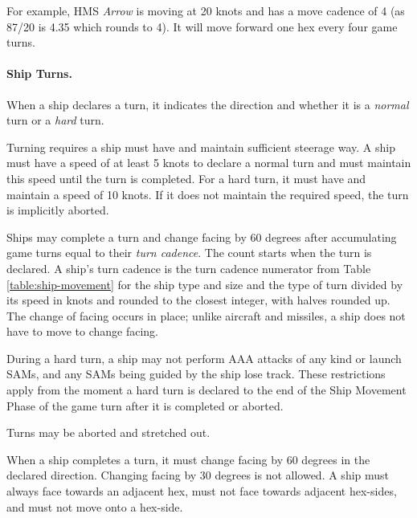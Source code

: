 {For example, HMS {\itshape Arrow} is moving at 20 knots and has a move cadence of 4 (as 87/20 is 4.35 which rounds to 4). It will move forward one hex every four game turns.

\paragraph{Ship Turns.}

When a ship declares a turn, it indicates the direction and whether it is a \emph{normal} turn or a \emph{hard} turn.

Turning requires a ship must have and maintain sufficient steerage way. A ship must have a speed of at least 5 knots to declare a normal turn and must maintain this speed until the turn is completed. For a hard turn, it must have and maintain a speed of 10 knots. If it does not maintain the required speed, the turn is implicitly aborted. 

Ships may complete a turn and change facing by 60 degrees after accumulating game turns equal to their \emph{turn cadence}. The count starts when the turn is declared. A ship's turn cadence is the turn cadence numerator from Table \ref{table:ship-movement} for the ship type and size and the type of turn divided by its speed in knots and rounded to the closest integer, with halves rounded up. The change of facing occurs in place; unlike aircraft and missiles, a ship does not have to move to change facing.

During a hard turn, a ship may not perform AAA attacks of any kind or launch SAMs, and any SAMs being guided by the ship lose track. These restrictions apply from the moment a hard turn is declared to the end of the Ship Movement Phase of the game turn after it is completed or aborted.

Turns may be aborted and stretched out. 

When a ship completes a turn, it must change facing by 60 degrees in the declared direction. Changing facing by 30 degrees is not allowed. A ship must always face towards an adjacent hex, must not face towards adjacent hex-sides, and must not move onto a hex-side.



}

